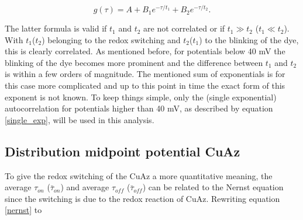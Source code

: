 \documentclass[twoside,single]{lion-msc}
\begin{document}
\begin{equation}\label{multi_exp}
g(\tau) = A +  B_{1}e^{-\tau/t_{1}} + B_{2}e^{-\tau/t_{2}}. 
\end{equation}

The latter formula is valid if $t_{1}$ and $t_{2}$ are not correlated or if $t_{1} \gg t_{2}$ ($t_{1} \ll  t_{2}$). With $t_{1}$($t_{2}$) belonging to the redox switching and $t_{2}$($t_{1}$) to the blinking of the dye, this is clearly correlated. As mentioned before, for potentials below 40 mV the blinking of the dye becomes more prominent and the difference between $t_{1}$ and $t_{2}$ is within a few orders of magnitude. The mentioned sum of exponentials is for this case more complicated and up to this point in time the exact form of this exponent is not known. To keep things simple, only the (single exponential) autocorrelation for potentials higher than 40 mV, as described by equation \ref{single_exp}, will be used in this analysis.  



\subsection{Distribution midpoint potential CuAz}
To give the redox switching of the CuAz a more quantitative meaning, the average $\tau_{on}$ ($\bar{\tau}_{on}$) and average $\tau_{off}$ ($\bar{\tau}_{off}$) can be related to the Nernst equation since the switching is due to the redox reaction of CuAz. Rewriting equation \ref{nernst} to 
\end{document}
